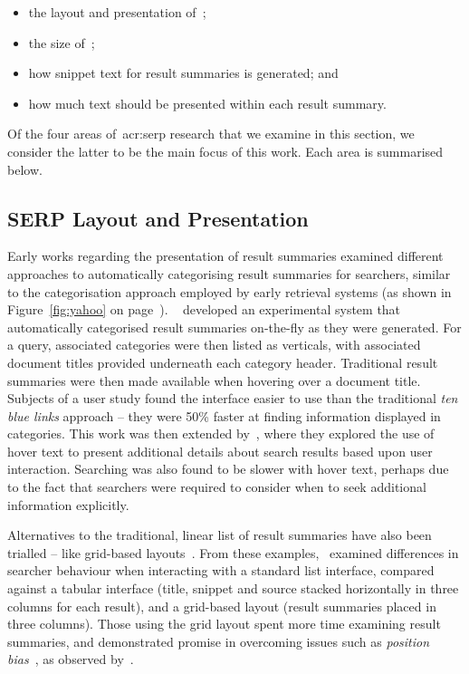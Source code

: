 \begin{itemize}
    \item{the layout and presentation of~;}
    \item{the size of~;}
    \item{how snippet text for result summaries is generated; and}
    \item{how much text should be presented within each result summary}.
\end{itemize}

Of the four areas of~\gls{acr:serp} research that we examine in this section, we consider the latter to be the main focus of this work. Each area is summarised below.

\subsection{SERP Layout and Presentation}
Early works regarding the presentation of result summaries examined different approaches to automatically categorising result summaries for searchers, similar to the categorisation approach employed by early retrieval systems (as shown in Figure~\ref{fig:yahoo} on page~\pageref{fig:yahoo}). ~\cite{chen2000order_to_web} developed an experimental system that automatically categorised result summaries on-the-fly as they were generated. For a query, associated categories were then listed as verticals, with associated document titles provided underneath each category header. Traditional result summaries were then made available when hovering over a document title. Subjects of a user study found the interface easier to use than the traditional \emph{ten blue links} approach -- they were 50\% faster at finding information displayed in categories. This work was then extended by~\cite{dumais2001results_in_context}, where they explored the use of hover text to present additional details about search results based upon user interaction. Searching was also found to be slower with hover text, perhaps due to the fact that searchers were required to consider when to seek additional information explicitly.

Alternatives to the traditional, linear list of result summaries have also been trialled -- like grid-based layouts~\citep{resnick2001modeling, kammerer2010interface, chierichetti2011two_dimensional_presentation}. From these examples,~\cite{kammerer2010interface} examined differences in searcher behaviour when interacting with a standard list interface, compared against a tabular interface (title, snippet and source stacked horizontally in three columns for each result), and a grid-based layout (result summaries placed in three columns). Those using the grid layout spent more time examining result summaries, and demonstrated promise in overcoming issues such as \emph{position bias}~\citep{craswell2008click_models}, as observed by~\cite{joachims2005click_model}.


